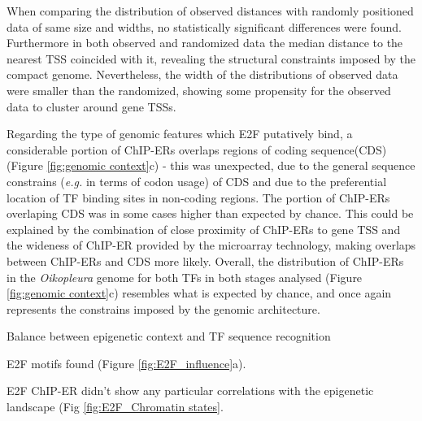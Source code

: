 \documentclass[11pt,twoside,a4paper]{report}
\begin{document}
		When comparing the distribution of observed distances with randomly positioned data of same size and widths, no statistically significant differences were found. Furthermore in both observed and randomized data the median distance to the nearest TSS coincided with it, revealing the structural constraints imposed by the compact genome. Nevertheless, the width of the distributions of observed data were smaller than the randomized, showing some propensity for the observed data to cluster around gene TSSs.
		
		Regarding the type of genomic features which E2F putatively bind, a considerable portion of ChIP-ERs overlaps regions of coding sequence(CDS) (Figure \ref{fig:genomic context}c) - this was unexpected, due to the general sequence constrains (\textit{e.g.} in terms of codon usage) of CDS and due to the preferential location of TF binding sites in non-coding regions. The portion of ChIP-ERs overlaping CDS was in some cases higher than expected by chance. This could be explained  by the combination of close proximity of ChIP-ERs to gene TSS and the wideness of ChIP-ER provided by the microarray technology, making overlaps between ChIP-ERs and CDS more likely.
		Overall, the distribution of ChIP-ERs in the \textit{Oikopleura} genome for both TFs in both stages analysed (Figure \ref{fig:genomic context}c) resembles what is expected by chance, and once again represents the constrains imposed by the genomic architecture.
		
		
		
		Balance between epigenetic context and TF sequence recognition		
		
		
		
		
		E2F motifs found (Figure \ref{fig:E2F_influence}a).
				
		E2F ChIP-ER didn't show any particular correlations with the epigenetic landscape (Fig \ref{fig:E2F_Chromatin states}.
		
\end{document}
